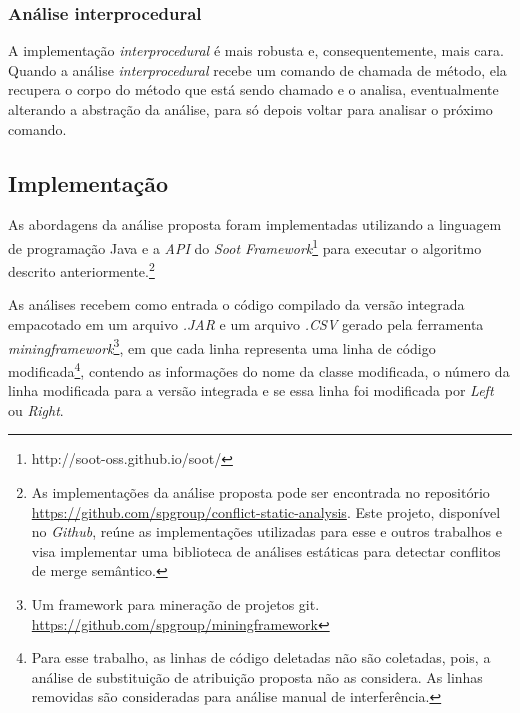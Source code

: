 \subsubsection*{Análise interprocedural}

A implementação \emph{interprocedural} é mais robusta e, consequentemente, mais cara. Quando a análise \emph{interprocedural} recebe um comando de chamada de método, ela recupera o corpo do método que está sendo chamado e o analisa, eventualmente alterando a abstração da análise, para só depois voltar para analisar o próximo comando. 


\subsection{Implementação}
As abordagens da análise proposta foram implementadas utilizando a linguagem de programação Java e a \emph{API} do \emph{Soot Framework}\footnote{http://soot-oss.github.io/soot/} para executar o algoritmo descrito anteriormente.\footnote{As implementações da análise proposta pode ser encontrada no repositório \href{https://github.com/spgroup/conflict-static-analysis}{https://github.com/spgroup/conflict-static-analysis}. Este projeto, disponível no \emph{Github}, reúne as implementações utilizadas para esse e outros trabalhos e visa implementar uma biblioteca de análises estáticas para detectar conflitos de merge semântico.} 

As análises recebem como entrada o código compilado da versão integrada empacotado em um arquivo \emph{.JAR} e um arquivo \emph{.CSV} gerado pela ferramenta \emph{miningframework}\footnote{Um framework para mineração de projetos git. \href{https://github.com/spgroup/miningframework}{https://github.com/spgroup/miningframework}}, em que cada linha representa uma linha de código modificada\footnote{Para esse trabalho, as linhas de código deletadas não são coletadas, pois, a análise de substituição de atribuição proposta não as considera. As linhas removidas são consideradas para análise manual de interferência.}, contendo as informações do nome da classe modificada, o número da linha modificada para a versão integrada e se essa linha foi modificada por \emph{Left} ou \emph{Right}.